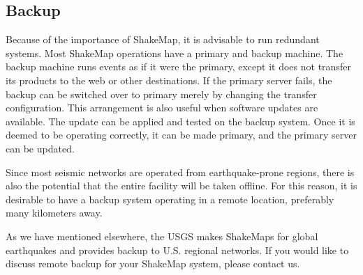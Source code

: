 \documentclass[letterpaper,10pt,english]{sphinxmanual}
\begin{document}
\subsection{Backup}
\label{software_guide:backup}
Because of the importance of ShakeMap, it is advisable to run redundant systems. Most
ShakeMap operations have a primary and backup machine. The backup machine runs
events as if it were the primary, except it does not transfer its products to the web or other
destinations. If the primary server fails, the backup can be switched over to primary
merely by changing the transfer configuration. This arrangement is also useful when
software updates are available. The update can be applied and tested on the backup
system. Once it is deemed to be operating correctly, it can be made primary, and the
primary server can be updated.

Since most seismic networks are operated from earthquake-prone regions, there is also
the potential that the entire facility will be taken offline. For this reason, it is desirable to
have a backup system operating in a remote location, preferably many kilometers away.

As we have mentioned elsewhere, the USGS makes ShakeMaps for global earthquakes
and provides backup to U.S. regional networks. If you would like to discuss remote
backup for your ShakeMap system, please contact us.
\end{document}

